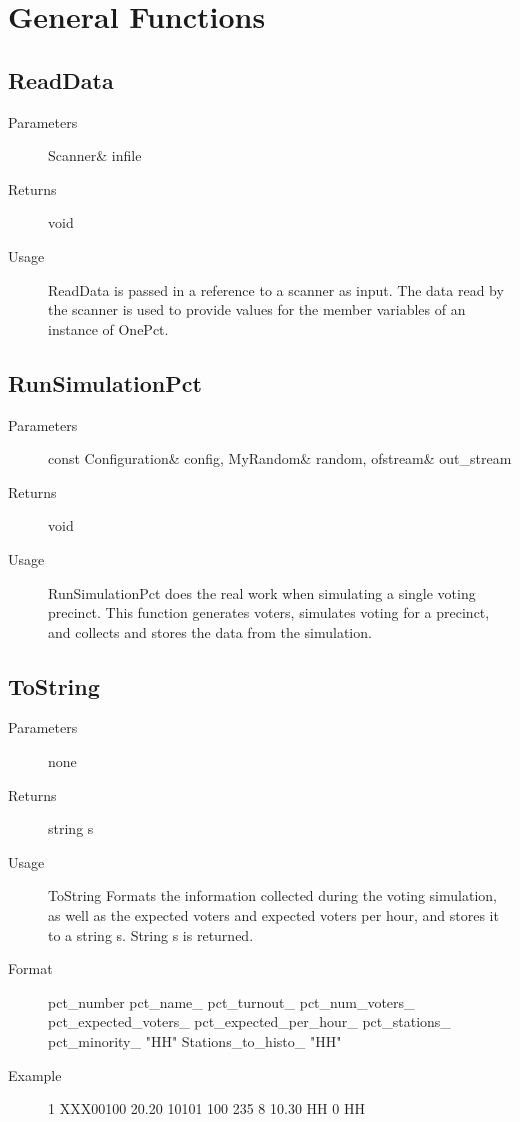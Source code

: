 \section{General Functions}

\subsection{ReadData}
\begin{description}
\item[Parameters] Scanner\& infile
\item[Returns] void
\item[Usage] ReadData is passed in a reference to a scanner as input.  The data read by the scanner is used to provide values for the member variables of an instance of OnePct.
\end{description}


\subsection{RunSimulationPct}
\begin{description}
\item[Parameters] const Configuration\& config, MyRandom\& random, ofstream\& out\_stream
\item[Returns] void
\item[Usage] RunSimulationPct does the real work when simulating a single voting precinct.  This function generates voters, simulates voting for a precinct, and collects and stores the data from the simulation.
\end{description}

\subsection{ToString} \label{ngrah-onepct-tostring}
\begin{description}
\item[Parameters] none
\item[Returns] string s
\item[Usage] ToString Formats the information collected during the voting simulation, as well as the expected voters and expected voters per hour, and stores it to a string s.  String s is returned.
\item[Format] pct\_number  pct\_name\_ pct\_turnout\_  pct\_num\_voters\_  pct\_expected\_voters\_  pct\_expected\_per\_hour\_  pct\_stations\_ pct\_minority\_  "HH" Stations\_to\_histo\_ "HH"
\item[Example] 1  XXX00100 20.20      10101     100     235  8   10.30 HH    0 HH
\end{description}


